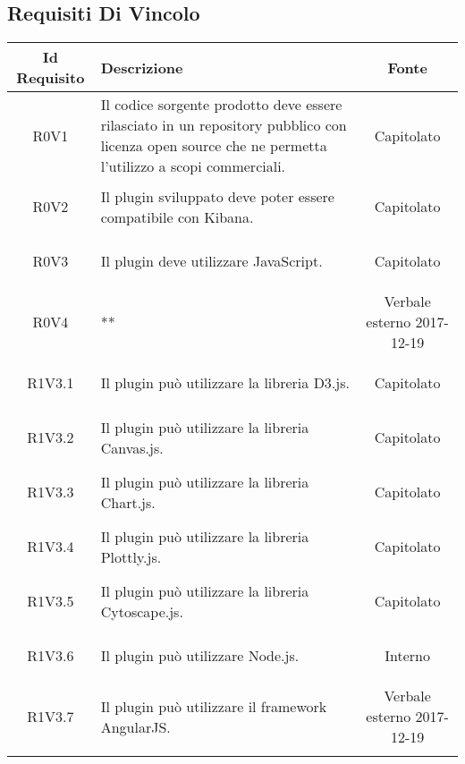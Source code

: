 \subsection{Requisiti Di Vincolo}
\normalsize
\begin{longtable}{|c|>{\centering}m{7cm}|c|}
\hline
\textbf{Id Requisito} & \textbf{Descrizione} & \textbf{Fonte}\\
\hline
\endhead
\hypertarget{R0V1}{R0V1} & Il codice sorgente prodotto deve essere rilasciato in un repository pubblico con licenza open source che ne permetta l'utilizzo a scopi commerciali. & Capitolato  \\ \hline 
\hypertarget{R0V2}{R0V2} & Il plugin sviluppato deve poter essere compatibile con Kibana. & Capitolato  \\ \hline 
\hypertarget{R0V3}{R0V3} & Il plugin deve utilizzare JavaScript. & Capitolato  \\ \hline 
\hypertarget{R0V4}{R0V4} & **  & Verbale esterno 2017-12-19 \\ \hline 
\hypertarget{R1V3.1}{R1V3.1} & Il plugin può utilizzare la libreria D3.js. & Capitolato  \\ \hline 
\hypertarget{R1V3.2}{R1V3.2} & Il plugin può utilizzare la libreria Canvas.js. & Capitolato  \\ \hline 
\hypertarget{R1V3.3}{R1V3.3} & Il plugin può utilizzare la libreria Chart.js. & Capitolato  \\ \hline 
\hypertarget{R1V3.4}{R1V3.4} & Il plugin può utilizzare la libreria Plottly.js. & Capitolato  \\ \hline 
\hypertarget{R1V3.5}{R1V3.5} & Il plugin può utilizzare la libreria Cytoscape.js. & Capitolato  \\ \hline 
\hypertarget{R1V3.6}{R1V3.6} & Il plugin può utilizzare Node.js. & Interno \\ \hline 
\hypertarget{R1V3.7}{R1V3.7} & Il plugin può utilizzare il framework AngularJS. & Verbale esterno 2017-12-19 \\ \hline 
\caption[Requisiti Di Vincolo]{Requisiti Di Vincolo
\label{tabella:req3}
\end{longtable}
\clearpage
